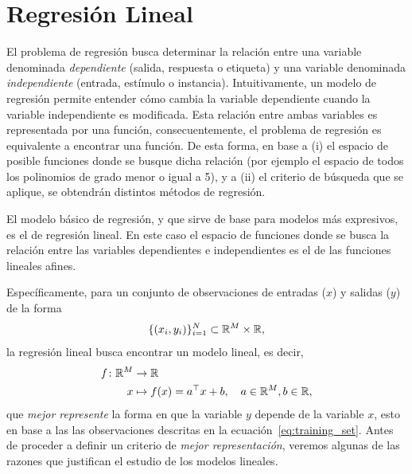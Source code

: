 
\section{Regresión Lineal} 

El problema de regresión busca determinar la relación entre una variable denominada \emph{dependiente} (salida, respuesta o etiqueta) y una variable denominada \emph{independiente} (entrada, estímulo o instancia). Intuitivamente, un modelo de regresión permite entender cómo cambia la variable dependiente cuando la variable independiente es modificada. Esta relación entre ambas variables es representada por una función, consecuentemente, el problema de regresión es equivalente a encontrar una función. De esta forma, en base a (i) el espacio de posible funciones donde se busque dicha relación (por ejemplo el espacio de todos los polinomios de grado menor o igual a 5), y a (ii) el criterio de búsqueda que se aplique, se obtendrán distintos métodos de regresión. 

El modelo básico de regresión, y que sirve de base para modelos más expresivos, es el de regresión lineal. En este caso el espacio de funciones donde se busca la relación entre las variables dependientes e independientes es el de las funciones lineales afines. 

Específicamente, para un conjunto de observaciones de entradas ($x$) y salidas ($y$) de la forma
\begin{equation}
	\{(x_i,y_i)\}_{i=1}^N\subset {\mathbb R}^M \times {\mathbb R},
	\label{eq:training_set}
\end{equation}
la regresión lineal busca encontrar un modelo lineal, es decir,  
\begin{align}
  f \colon {\mathbb R}^M &\to {\mathbb R}\nonumber\\
  x &\mapsto f(x)=a^\top x + b,\quad a\in{\mathbb R}^M,b\in{\mathbb R},
 \label{eq:reg_lin_fn} 
\end{align}
que \emph{mejor represente} la forma en que la variable $y$ depende de la variable $x$, esto en base a las las observaciones descritas en la ecuación~\eqref{eq:training_set}. Antes de proceder a definir un criterio de \emph{mejor representación}, veremos algunas de las razones que justifican el estudio de los modelos lineales. 

